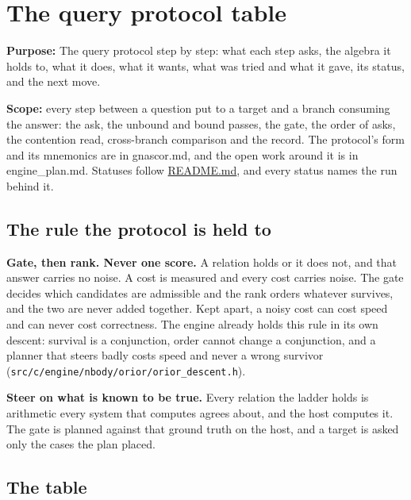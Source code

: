 \chapter{\texorpdfstring{The query protocol table}{The query protocol table}}
\label{chap:query-protocol-table}

\textbf{Purpose:} The query protocol step by step: what each step asks, the algebra it holds to, what it does, what it wants, what was tried and what it gave, its status, and the next move.

\textbf{Scope:} every step between a question put to a target and a branch consuming the answer: the ask, the unbound and bound passes, the gate, the order of asks, the contention read, cross-branch comparison and the record. The protocol's form and its mnemonics are in gnascor.md, and the open work around it is in engine\_\allowbreak{}plan.md. Statuses follow \hyperref[chap:readme]{README.md}, and every status names the run behind it.

\section{\texorpdfstring{The rule the protocol is held to}{The rule the protocol is held to}}

\textbf{Gate, then rank. Never one score.} A relation holds or it does not, and that answer carries no noise. A cost is measured and every cost carries noise. The gate decides which candidates are admissible and the rank orders whatever survives, and the two are never added together. Kept apart, a noisy cost can cost speed and can never cost correctness. The engine already holds this rule in its own descent: survival is a conjunction, order cannot change a conjunction, and a planner that steers badly costs speed and never a wrong survivor (\texttt{src/\allowbreak{}c/\allowbreak{}engine/\allowbreak{}nbody/\allowbreak{}orior/\allowbreak{}orior\_\allowbreak{}descent.\allowbreak{}h}).

\textbf{Steer on what is known to be true.} Every relation the ladder holds is arithmetic every system that computes agrees about, and the host computes it. The gate is planned against that ground truth on the host, and a target is asked only the cases the plan placed.

\section{\texorpdfstring{The table}{The table}}

